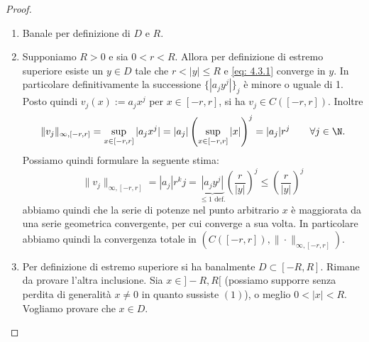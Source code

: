 \begin{proof}
    \begin{enumerate}
        \item Banale per definizione di $D$ e $R$.
        \item Supponiamo $R>0$ e sia $0<r<R$. Allora per definizione di estremo superiore esiste un $y\in D$ tale che $r<|y|\leq R$ e \eqref{eq: 4.3.1} converge in $y$. In particolare definitivamente la successione $\{|a_jy^j|\}_j$ è minore o uguale di 1. Posto quindi $v_j(x):=a_jx^j$ per $x\in [-r,r]$, si ha $v_j\in C([-r,r])$. Inoltre \[\|v_j\|_{\infty, [-r,r]} = \sup_{x\in[-r,r]}|a_jx^j| = |a_j|\left(\sup_{x\in [-r,r]}|x|\right)^j = |a_j|r^j\qquad \forall j\in \N.\]
        Possiamo quindi formulare la seguente stima:
        \[\|v_j\|_{\infty, [-r,r]} = |a_j|r^kj = \underbrace{|a_jy^j|}_{\leq 1 \text{ def.}}\left(\frac{r}{|y|}\right)^j \leq \left(\frac{r}{|y|}\right)^j\]
        abbiamo quindi che la serie di potenze nel punto arbitrario $x$ è maggiorata da una serie geometrica convergente, per cui converge a sua volta. In particolare abbiamo quindi la convergenza totale in $(C([-r,r]), \|\cdot\|_{\infty, [-r,r]})$.
        \item Per definizione di estremo superiore si ha banalmente $D \subset[-R, R]$. Rimane da provare l'altra inclusione. Sia $x\in ]-R,R[$ (possiamo supporre senza perdita di generalità $x\neq 0$ in quanto sussiste $(1)$), o meglio $0<|x|<R$. Vogliamo provare che $x\in D$.
        

\end{enumerate}
\end{proof}

